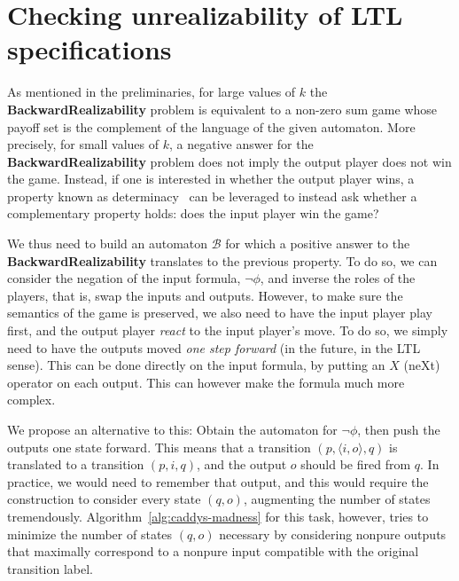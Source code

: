 \documentclass[runningheads,a4paper]{llncs}
\begin{document}
\section{Checking unrealizability of LTL specifications}\label{sec:unreal}

As mentioned in the preliminaries, for large values of $k$ the 
\textbf{BackwardRealizability} problem is equivalent to a non-zero sum game
whose payoff set is the complement of the language of the given automaton.
More precisely, for small values of $k$, a negative answer for the
\textbf{BackwardRealizability} problem does not imply the output player does
not win the game. Instead, if one is interested in whether the output player
wins, a property known as determinacy~\cite{borel} can be leveraged to instead
ask whether a complementary property holds: does the input player win the
game?

We thus need to build an automaton \(\mathcal{B}\) for which a positive answer to
the \textbf{BackwardRealizability} translates to the previous property.  To do
so, we can consider the negation of the input formula, \(\neg\phi\), and inverse the
roles of the players, that is, swap the inputs and outputs.  However, to make
sure the semantics of the game is preserved, we also need to have the input
player play first, and the output player \emph{react} to the input player's
move.  To do so, we simply need to have the outputs moved \emph{one step
  forward} (in the future, in the LTL sense).  This can be done directly on the
input formula, by putting an \(X\) (neXt) operator on each output.  This can
however make the formula much more complex.

We propose an alternative to this: Obtain the automaton for \(\neg \phi\), then push the
outputs one state forward.  This means that a transition \((p, \langle i, o \rangle, q)\) is
translated to a transition \((p, i, q)\), and the output \(o\) should be fired from
\(q\).  In practice, we would need to remember that output, and this would require
the construction to consider every state \((q, o)\), augmenting the number of
states tremendously.  Algorithm~\ref{alg:caddys-madness} for this task, however,
tries to minimize the number of states \((q, o)\) necessary by considering nonpure
outputs that maximally correspond to a nonpure input compatible with the
original transition label.
\end{document}
